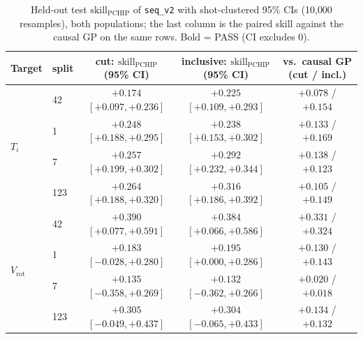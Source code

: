\documentclass[10pt]{article}
\newcommand{\Ti}{\ensuremath{T_i}}
\newcommand{\Vrot}{\ensuremath{V_\mathrm{rot}}}
\newcommand{\skillp}{\ensuremath{\mathrm{skill}_{\mathrm{PCHIP}}}}
\newcommand{\seqv}{\texttt{seq\_v2}}
\begin{document}
\begin{table}[t]
  \centering
  \caption{Held-out test $\skillp$ of \seqv{} with shot-clustered 95\% CIs
  (10{,}000 resamples), both populations; the last column is the paired skill
  against the causal GP on the same rows. Bold = PASS (CI excludes 0).}
  \label{tab:headline}
  \small
  \begin{tabular}{llccc}
    \toprule
    Target & split & cut: $\skillp$ (95\% CI) & inclusive: $\skillp$ (95\% CI) & vs.\ causal GP (cut / incl.) \\
    \midrule
    \multirow{4}{*}{\Ti{}}
      & 42  & $\mathbf{+0.174}$ $[+0.097, +0.236]$ & $\mathbf{+0.225}$ $[+0.109, +0.293]$ & $\mathbf{+0.078}$ / $\mathbf{+0.154}$ \\
      & 1   & $\mathbf{+0.248}$ $[+0.188, +0.295]$ & $\mathbf{+0.238}$ $[+0.153, +0.302]$ & $\mathbf{+0.133}$ / $\mathbf{+0.169}$ \\
      & 7   & $\mathbf{+0.257}$ $[+0.199, +0.302]$ & $\mathbf{+0.292}$ $[+0.232, +0.344]$ & $\mathbf{+0.138}$ / $\mathbf{+0.123}$ \\
      & 123 & $\mathbf{+0.264}$ $[+0.188, +0.320]$ & $\mathbf{+0.316}$ $[+0.186, +0.392]$ & $\mathbf{+0.105}$ / $\mathbf{+0.149}$ \\
    \midrule
    \multirow{4}{*}{\Vrot{}}
      & 42  & $\mathbf{+0.390}$ $[+0.077, +0.591]$ & $\mathbf{+0.384}$ $[+0.066, +0.586]$ & $\mathbf{+0.331}$ / $\mathbf{+0.324}$ \\
      & 1   & $+0.183$ $[-0.028, +0.280]$ & $\mathbf{+0.195}$ $[+0.000, +0.286]$ & $+0.130$ / $\mathbf{+0.143}$ \\
      & 7   & $+0.135$ $[-0.358, +0.269]$ & $+0.132$ $[-0.362, +0.266]$ & $+0.020$ / $+0.018$ \\
      & 123 & $+0.305$ $[-0.049, +0.437]$ & $+0.304$ $[-0.065, +0.433]$ & $\mathbf{+0.134}$ / $+0.132$ \\
    \bottomrule
  \end{tabular}
\end{table}
\end{document}
